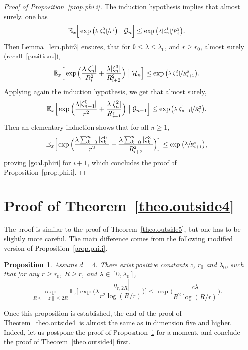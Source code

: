 \documentclass[JEP,XML,SOM,Unicode,NoFloatCountersInSection,published]{cedram}
\theoremstyle{plain}
\newtheorem{proposition}[theorem]{Proposition}
\theoremstyle{definition}
\newcommand{\1}{{\text{\Large $\mathfrak 1$}}}
\begin{document}
\begin{proof}[Proof of Proposition~\ref{prop.phi.i}]
The induction hypothesis implies that almost surely, one has
\[
\mathbb E_x\Big[\exp\big(\sfrac{\lambda |\zeta_n^0|}{r^2}\big) \bigm| \mathcal G_n \Big] \le \exp\big(\sfrac{\lambda|\zeta_n^1|}{R_i^2}\big).
\]
Then Lemma~\ref{lem.phir3} ensures,
that for $0\le \lambda \le \lambda_0$, and $r\ge r_0$, almost surely (recall~\eqref{positions}),
\[
\mathbb E_x\Big[\exp\Big(\frac{\lambda |\zeta_n^1|}{R_i^2}+ \frac{\lambda |\zeta^3_n|}{R_{i+2}^2}\Big) \bigm| \mathcal H_n \Big] \le
\exp\big(\sfrac{\lambda |\zeta_n^2|}{R_{i+1}^2}\big).
\]
Applying again the induction hypothesis, we get that almost surely,
\[
\mathbb E_x\Big[\exp\Big(\frac{\lambda |\zeta_{n-1}^0|}{r^2}+ \frac{\lambda |\zeta^2_n|}{R_{i+1}^2}\Big) \bigm| \mathcal G_{n-1} \Big]
\le \exp \big(\sfrac{\lambda |\zeta_{n-1}^1|}{R_i^2}\big).
\]
Then an elementary induction shows that for all $n\ge 1$,
\[
\mathbb E_x\Big[\exp\Big(\frac{\lambda\sum_{k=0}^n |\zeta_k^0|}{r^2}+\frac{\lambda\sum_{k=0}^n |\zeta^3_k|}{R_{i+2}^2}\Big)\Big]
\le \exp\big(\sfrac{\lambda}{R_{i+1}^2}\big),
\]
proving \eqref{goal.phiri} for $i+1$,
which concludes the proof of Proposition~\ref{prop.phi.i}.
\end{proof}

\section{Proof of Theorem~\ref{theo.outside4}}\label{sec-outside4}
The proof is similar to the proof of Theorem~\ref{theo.outside5},
but one has to be slightly more careful.
The main difference comes from the following modified version of Proposition~\ref{prop.phi.i}.

\begin{proposition}\label{prop.phi.d4}
Assume $d=4$. There exist positive constants $c$, $r_0$ and $\lambda_0$, such that for any $r\ge r_0$, $R\ge r$, and $\lambda\in[0,\lambda_0]$,
\[
\sup_{R\le \|z\|\le 2R} \mathbb E_z \Big[\exp\Big(\lambda\frac{|\eta_{r,2R}|}{r^2\log(R/r)}\Big)\Big] \le \exp\Big(\frac{c\lambda}{R^2\log(R/r)}\Big).
\]
\end{proposition}
Once this proposition is established, the end of the proof of Theorem~\ref{theo.outside4} is almost the same as in dimension five and higher. Indeed,
let us postpone the proof of Proposition~\ref{prop.phi.d4} for a moment, and conclude the proof of Theorem~\ref{theo.outside4} first.
\end{document}
